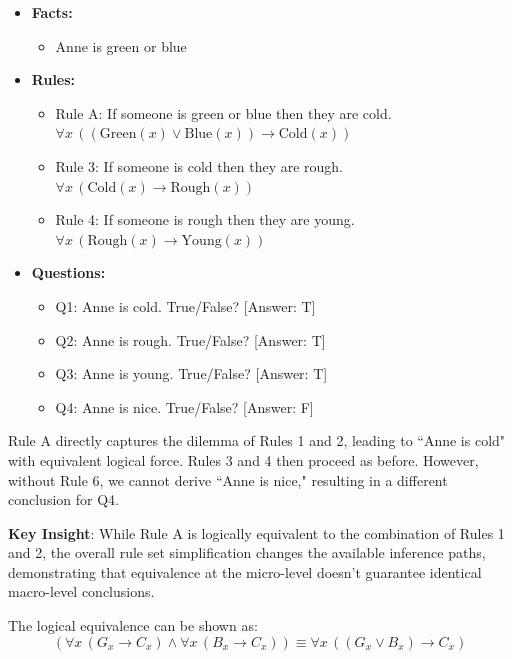 \documentclass{article} %
\begin{document}
\begin{itemize}
    \item \textbf{Facts:}
    \begin{itemize}
        \item Anne is green or blue
    \end{itemize}
    
    \item \textbf{Rules:}
    \begin{itemize}
        \item Rule A: If someone is green or blue then they are cold. $\forall x \, ((\text{Green}(x) \lor \text{Blue}(x)) \rightarrow \text{Cold}(x))$
        \item Rule 3: If someone is cold then they are rough. $\forall x \, (\text{Cold}(x) \rightarrow \text{Rough}(x))$
        \item Rule 4: If someone is rough then they are young. $\forall x \, (\text{Rough}(x) \rightarrow \text{Young}(x))$
    \end{itemize}
    
    \item \textbf{Questions:}
    \begin{itemize}
        \item Q1: Anne is cold. True/False? [Answer: T]
        \item Q2: Anne is rough. True/False? [Answer: T]
        \item Q3: Anne is young. True/False? [Answer: T]
        \item Q4: Anne is nice. True/False? [Answer: F]  
    \end{itemize}
\end{itemize}

Rule A directly captures the dilemma of Rules 1 and 2, leading to ``Anne is cold" with equivalent logical force. Rules 3 and 4 then proceed as before. However, without Rule 6, we cannot derive ``Anne is nice," resulting in a different conclusion for Q4.

\textbf{Key Insight}: While Rule A is logically equivalent to the combination of Rules 1 and 2, the overall rule set simplification changes the available inference paths, demonstrating that equivalence at the micro-level doesn't guarantee identical macro-level conclusions.

The logical equivalence can be shown as:
\[
(\forall x \, (G_x \rightarrow C_x) \land \forall x \, (B_x \rightarrow C_x))
\equiv 
\forall x \, ((G_x \lor B_x) \rightarrow C_x)
\]
\end{document}
